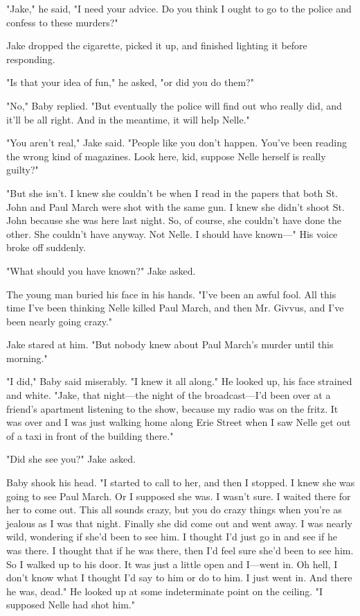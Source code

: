 \documentclass{novel}
\begin{document}
"Jake," he said, "I need your advice. Do you think I ought to go to the police and confess to these murders?"

Jake dropped the cigarette, picked it up, and finished lighting it before responding.

"Is that your idea of fun," he asked, "or did you do them?"

"No," Baby replied. "But eventually the police will find out who really did, and it'll be all right. And in the meantime, it will help Nelle."

"You aren't real," Jake said. "People like you don't happen. You've been reading the wrong kind of magazines. Look here, kid, suppose Nelle herself is really guilty?"

"But she isn't. I knew she couldn't be when I read in the papers that both St. John and Paul March were shot with the same gun. I knew she didn't shoot St. John because she was here last night. So, of course, she couldn't have done the other. She couldn't have anyway. Not Nelle. I should have known—" His voice broke off suddenly.

"What should you have known?" Jake asked.

The young man buried his face in his hands. "I've been an awful fool. All this time I've been thinking Nelle killed Paul March, and then Mr. Givvus, and I've been nearly going crazy."

Jake stared at him. "But nobody knew about Paul March's murder until this morning."

"I did," Baby said miserably. "I knew it all along." He looked up, his face strained and white. "Jake, that night—the night of the broadcast—I'd been over at a friend's apartment listening to the show, because my radio was on the fritz. It was over and I was just walking home along Erie Street when I saw Nelle get out of a taxi in front of the building there."

"Did she see you?" Jake asked.

Baby shook his head. "I started to call to her, and then I stopped. I knew she was going to see Paul March. Or I supposed she was. I wasn't sure. I waited there for her to come out. This all sounds crazy, but you do crazy things when you're as jealous as I was that night. Finally she did come out and went away. I was nearly wild, wondering if she'd been to see him. I thought I'd just go in and see if he was there. I thought that if he was there, then I'd feel sure she'd been to see him. So I walked up to his door. It was just a little open and I—went in. Oh hell, I don't know what I thought I'd say to him or do to him. I just went in. And there he was, dead." He looked up at some indeterminate point on the ceiling. "I supposed Nelle had shot him."
\end{document}
